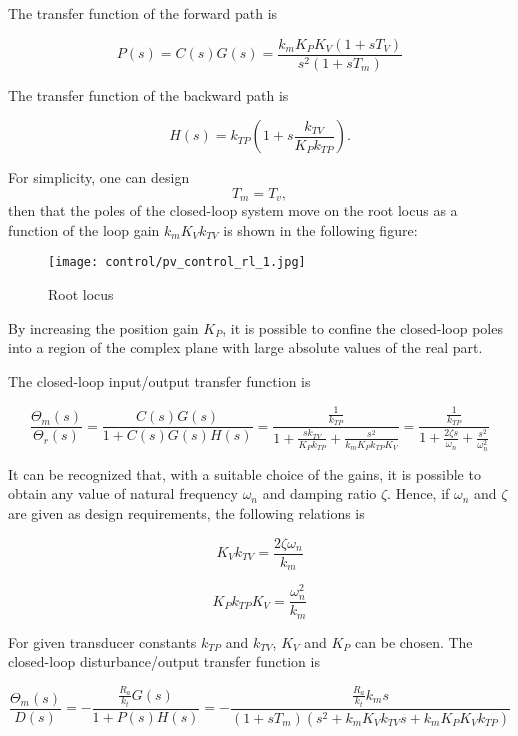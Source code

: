 \documentclass[10pt]{article}
\begin{document}
The transfer function of the forward path is

$$
P(s)=C(s)G(s)=\frac{k_{m} K_{P} K_{V}\left(1+s T_{V}\right)}{s^{2}\left(1+s T_{m}\right)}
$$






The transfer function of the backward path is

$$
H(s)=k_{T P}\left(1+s \frac{k_{T V}}{K_{P} k_{T P}}\right) .
$$


For simplicity, one can design $$
T_m=T_v,
$$ then that the poles of the closed-loop system move on the root locus as a function of the loop gain $k_{m} K_{V} k_{T V}$ is shown in the following figure:


        \begin{figure}[H]
    \centering
    \texttt{[image: control/pv\_control\_rl\_1.jpg]}
    \caption{Root locus}
    \label{fig.pv_control_rl_1}
\end{figure}




By increasing the position  gain $K_{P}$, it is possible to confine the closed-loop poles into a region of the complex plane with large absolute values of the real part. 

The closed-loop input/output transfer function is

$$
\frac{\Theta_{m}(s)}{\Theta_{r}(s)}=\frac{C(s)G(s)}{1+C(s)G(s)H(s)}=\frac{\frac{1}{k_{T P}}}{1+\frac{s k_{T V}}{K_{P} k_{T P}}+\frac{s^{2}}{k_{m} K_{P} k_{T P} K_{V}}}=\frac{\frac{1}{k_{T P}}}{1+\frac{2 \zeta s}{\omega_{n}}+\frac{s^{2}}{\omega_{n}^{2}}}
$$



It can be recognized that, with a suitable choice of the gains, it is possible to obtain any value of natural frequency $\omega_{n}$ and damping ratio $\zeta$. Hence, if $\omega_{n}$ and $\zeta$ are given as design requirements, the following relations is

$$
K_{V} k_{T V}=\frac{2 \zeta \omega_{n}}{k_{m}}
$$




$$
K_{P} k_{T P} K_{V}=\frac{\omega_{n}^{2}}{k_{m}}
$$

For given transducer constants $k_{T P}$ and $k_{T V}$,  $K_{V}$ and $K_{P}$ can be chosen.
The closed-loop disturbance/output transfer function is

$$
\frac{\Theta_{m}(s)}{D(s)}=-\frac{\frac{R_a}{k_t}G(s)}{1+P(s)H(s)}=-\frac{\frac{R_a}{k_t}k_ms}{(1+sT_m)(s^2+k_mK_Vk_{TV}s+k_mK_PK_Vk_{TP})}
$$
\end{document}
